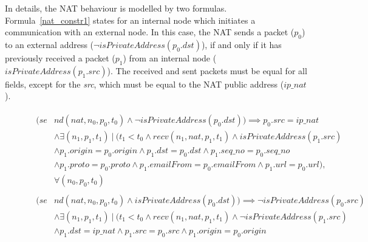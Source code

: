 In details, the NAT behaviour is modelled by two formulas. Formula~\ref{nat_constr1} states for an internal node which initiates a communication with an external node. In this case, the NAT sends a packet (\textit{$p_0$}) to an external address (\textit{$\neg isPrivateAddress(p_{0}.dst)$}), if and only if it has previously received a packet (\textit{$p_1$}) from an internal node (\textit{$isPrivateAddress(p_{1}.src)$}). The received and sent packets must be equal for all fields, except for the \textit{src}, which must be equal to the NAT public address (\textit{$ip\_nat$}).\\


\begin{figure}[h]
	{\footnotesize
		\begin{subequations}
			\begin{align}
			\begin{split}
			\label{nat_constr1}
			(se& nd(nat, n_{0}, p_{0}, t_{0}) \wedge \neg isPrivateAddress(p_{0}.dst)) \implies p_{0}.src = ip\_nat \\
			& \wedge \exists (n_{1}, p_{1}, t_{1}) \: | \: (t_{1} < t_{0} \wedge recv(n_{1}, nat, p_{1}, t_{1}) \wedge isPrivateAddress(p_{1}.src) \\
			& \wedge p_{1}.origin = p_{0}.origin \wedge p_{1}.dst = p_{0}.dst \wedge p_{1}.seq\_no = p_{0}.seq\_no \\
			& \wedge p_{1}.proto = p_{0}.proto \wedge p_{1}.emailFrom = p_{0}.emailFrom \wedge p_{1}.url = p_{0}.url), \\
			& \forall (n_{0}, p_{0}, t_{0})
			\end{split} \\
			\begin{split}
			\label{nat_constr2}
			(se& nd(nat, n_{0}, p_{0}, t_{0}) \wedge isPrivateAddress(p_{0}.dst)) \implies \neg isPrivateAddress(p_{0}.src) \\
			& \wedge \exists  (n_{1}, p_{1}, t_{1}) \: | \: (t_{1} < t_{0} \wedge recv(n_{1}, nat, p_{1}, t_{1}) \wedge \neg isPrivateAddress(p_{1}.src) \\
			& \wedge p_{1}.dst = ip\_nat \wedge p_{1}.src = p_{0}.src \wedge p_{1}.origin = p_{0}.origin \\

\end{split}
\end{align}
\end{subequations}}
\end{figure}
